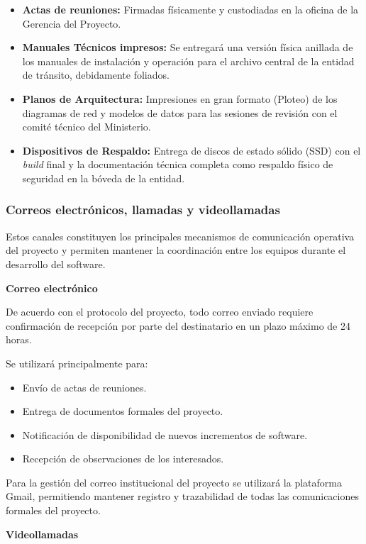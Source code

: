 \begin{itemize}
\item \textbf{Actas de reuniones:} Firmadas físicamente y custodiadas en la oficina de la Gerencia del Proyecto.
\item \textbf{Manuales Técnicos impresos:} Se entregará una versión física anillada de los manuales de instalación y operación para el archivo central de la entidad de tránsito, debidamente foliados.
\item \textbf{Planos de Arquitectura:} Impresiones en gran formato (Ploteo) de los diagramas de red y modelos de datos para las sesiones de revisión con el comité técnico del Ministerio.
\item \textbf{Dispositivos de Respaldo:} Entrega de discos de estado sólido (SSD) con el \textit{build} final y la documentación técnica completa como respaldo físico de seguridad en la bóveda de la entidad.
\end{itemize}

\subsubsection{Correos electrónicos, llamadas y videollamadas}

Estos canales constituyen los principales mecanismos de comunicación operativa del proyecto y permiten mantener la coordinación entre los equipos durante el desarrollo del software.

\textbf{Correo electrónico}

De acuerdo con el protocolo del proyecto, todo correo enviado requiere confirmación de recepción por parte del destinatario en un plazo máximo de 24 horas.

Se utilizará principalmente para:

\begin{itemize}
\item Envío de actas de reuniones.
\item Entrega de documentos formales del proyecto.
\item Notificación de disponibilidad de nuevos incrementos de software.
\item Recepción de observaciones de los interesados.
\end{itemize}

Para la gestión del correo institucional del proyecto se utilizará la plataforma Gmail, permitiendo mantener registro y trazabilidad de todas las comunicaciones formales del proyecto.

\textbf{Videollamadas}

